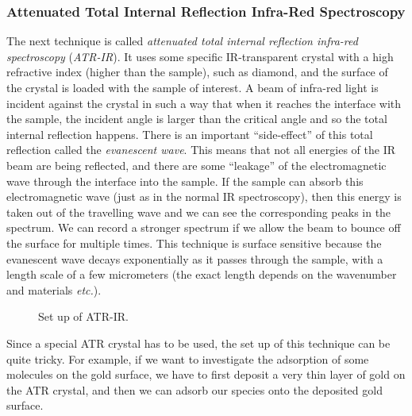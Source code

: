 \documentclass{article}
\theoremstyle{plain}\theoremheaderfont{\normalfont\itshape}\theorembodyfont{\rmfamily}\theoremseparator{.}\newtheorem*{rem}{Remark}\newtheorem*{ex}{Example}\newtheorem*{proof}{Proof}\newtheorem*{altp}{Alternative proof}
\theoremstyle{plain}\theoremheaderfont{\normalfont\bfseries}\theorembodyfont{\rmfamily}\theoremseparator{.}\newtheorem{thm}{Theorem}[section]\newtheorem{lem}[thm]{Lemma}\newtheorem{prop}[thm]{Proposition}\newtheorem*{cor}{Corollary}\newtheorem{defn}[thm]{Definition}\newtheorem{clm}[thm]{Claim}\newtheorem{clminproof}{Claim}\newtheorem*{law}{Law}\newtheorem{pos}[thm]{Postulate}
\theoremstyle{break}\theoremheaderfont{\normalfont\itshape}\theorembodyfont{\rmfamily}\theoremseparator{.\medskip}\newtheorem*{proofskip}{Proof}\newtheorem*{exs}{Examples}\newtheorem*{rems}{Remarks}
\theoremstyle{break}\theoremheaderfont{\normalfont\bfseries}\theorembodyfont{\rmfamily}\theoremseparator{.\medskip}\newtheorem{lemskip}[thm]{Lemma}\newtheorem{defnskip}[thm]{Definition}\newtheorem{propskip}[thm]{Proposition}\newtheorem{thmskip}[thm]{Theorem}
\numberwithin{equation}{section}
\begin{document}
	\subsubsection{Attenuated Total Internal Reflection Infra-Red Spectroscopy}
	The next technique is called \textit{attenuated total internal reflection infra-red spectroscopy} (\textit{ATR-IR}). It uses some specific IR-transparent crystal with a high refractive index (higher than the sample), such as diamond, and the surface of the crystal is loaded with the sample of interest. A beam of infra-red light is incident against the crystal in such a way that when it reaches the interface with the sample, the incident angle is larger than the critical angle and so the total internal reflection happens. There is an important ``side-effect'' of this total reflection called the \textit{evanescent wave}. This means that not all energies of the IR beam are being reflected, and there are some ``leakage'' of the electromagnetic wave through the interface into the sample. If the sample can absorb this electromagnetic wave (just as in the normal IR spectroscopy), then this energy is taken out of the travelling wave and we can see the corresponding peaks in the spectrum. We can record a stronger spectrum if we allow the beam to bounce off the surface for multiple times. This technique is surface sensitive because the evanescent wave decays exponentially as it passes through the sample, with a length scale of a few micrometers (the exact length depends on the wavenumber and materials \textit{etc.}).

	\begin{figure}[ht!]
		\centering
		\caption{Set up of ATR-IR.}
	\end{figure}

	Since a special ATR crystal has to be used, the set up of this technique can be quite tricky. For example, if we want to investigate the adsorption of some molecules on the gold surface, we have to first deposit a very thin layer of gold on the ATR crystal, and then we can adsorb our species onto the deposited gold surface.
\end{document}
